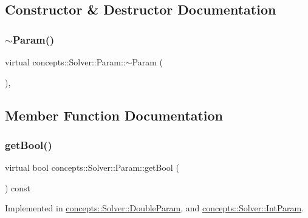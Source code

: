\subsection{Constructor \& Destructor Documentation}
\mbox{\label{classconcepts_1_1_solver_1_1_param_a9cfb9b36634ad826bf5766306b9823bd}} 
\subsubsection{\texorpdfstring{$\sim$\+Param()}{~Param()}}
{\footnotesize\ttfamily virtual concepts\+::\+Solver\+::\+Param\+::$\sim$\+Param (\begin{DoxyParamCaption}{ }\end{DoxyParamCaption})\hspace{0.3cm}{\ttfamily [inline]}, {\ttfamily [virtual]}}



\subsection{Member Function Documentation}
\mbox{\label{classconcepts_1_1_solver_1_1_param_aaca8a78f4669d189764e9e654143d705}} 
\subsubsection{\texorpdfstring{get\+Bool()}{getBool()}}
{\footnotesize\ttfamily virtual bool concepts\+::\+Solver\+::\+Param\+::get\+Bool (\begin{DoxyParamCaption}{ }\end{DoxyParamCaption}) const\hspace{0.3cm}{\ttfamily [pure virtual]}}



Implemented in \hyperlink{classconcepts_1_1_solver_1_1_double_param_a59c7fa9b821c071f13d6182d6b525473}{concepts\+::\+Solver\+::\+Double\+Param}, and \hyperlink{classconcepts_1_1_solver_1_1_int_param_aa991108bd194ff4f9cb21230549a74f5}{concepts\+::\+Solver\+::\+Int\+Param}.

